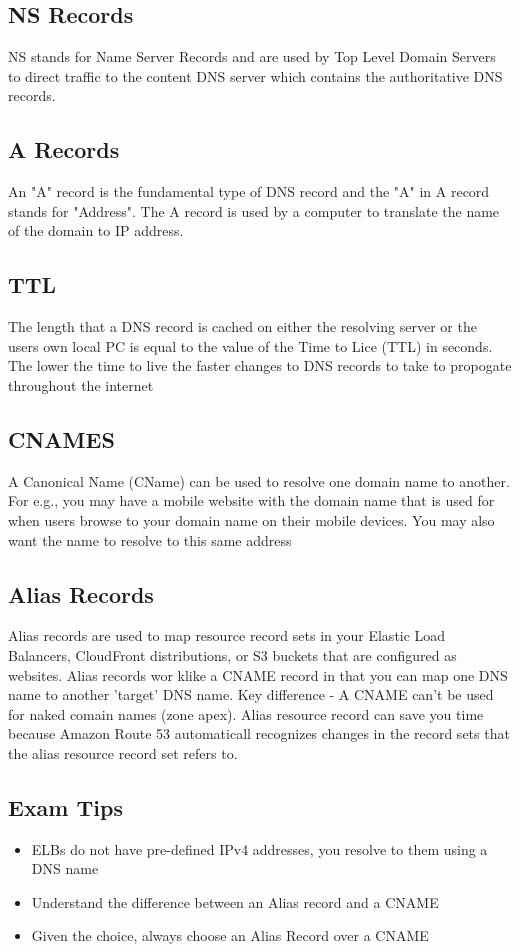 \documentclass{article}
\begin{document}
\subsection{NS Records}
NS stands for Name Server Records and are used by Top Level Domain Servers to direct traffic to the content DNS server which contains the authoritative DNS records.

\subsection{A Records}
An "A" record is the fundamental type of DNS record and the "A" in A record stands for "Address". The A record is used by a computer to translate the name of the domain to IP address.

\subsection{TTL}
The length that a DNS record is cached on either the resolving server or the users own local PC is equal to the value of the Time to Lice (TTL) in seconds. The lower the time to live the faster changes to DNS records to take to propogate throughout the internet

\subsection{CNAMES}
A Canonical Name (CName) can be used to resolve one domain name to another. For e.g., you may have a mobile website with the domain name that is used for when users browse to your domain name on their mobile devices. You may also want the name to resolve to this same address

\subsection{Alias Records}
Alias records are used to map resource record sets in your Elastic Load Balancers, CloudFront distributions, or S3 buckets that are configured as websites. Alias records wor klike a CNAME record in that you can map one DNS name to another 'target' DNS name. Key difference - A CNAME can't be used for naked comain names (zone apex). Alias resource record can save you time because Amazon Route 53 automaticall recognizes changes in the record sets that the alias resource record set refers to.

\subsection{Exam Tips}
\begin{itemize}
\item
ELBs do not have pre-defined IPv4 addresses, you resolve to them using a DNS name

\item
Understand the difference between an Alias record and a CNAME

\item
Given the choice, always choose an Alias Record over a CNAME

\end{itemize}
\end{document}
